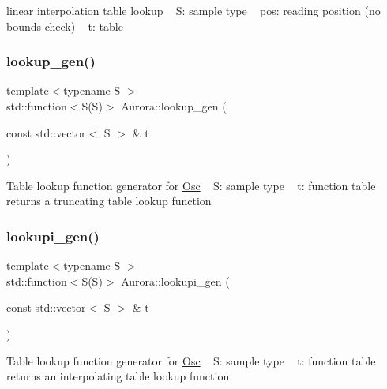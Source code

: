linear interpolation table lookup ~\newline
S\+: sample type ~\newline
pos\+: reading position (no bounds check) ~\newline
t\+: table \mbox{\label{namespace_aurora_ade912bee8dbe0351b2193809ce592d8b}} 
\subsubsection{\texorpdfstring{lookup\+\_\+gen()}{lookup\_gen()}}
{\footnotesize\ttfamily template$<$typename S $>$ \\
std\+::function$<$S(S)$>$ Aurora\+::lookup\+\_\+gen (\begin{DoxyParamCaption}\item[{const std\+::vector$<$ S $>$ \&}]{t }\end{DoxyParamCaption})}

Table lookup function generator for \hyperlink{class_aurora_1_1_osc}{Osc} ~\newline
S\+: sample type ~\newline
t\+: function table ~\newline
returns a truncating table lookup function \mbox{\label{namespace_aurora_a043c55515e053a8d6f31ed7077a1bea6}} 
\subsubsection{\texorpdfstring{lookupi\+\_\+gen()}{lookupi\_gen()}}
{\footnotesize\ttfamily template$<$typename S $>$ \\
std\+::function$<$S(S)$>$ Aurora\+::lookupi\+\_\+gen (\begin{DoxyParamCaption}\item[{const std\+::vector$<$ S $>$ \&}]{t }\end{DoxyParamCaption})}

Table lookup function generator for \hyperlink{class_aurora_1_1_osc}{Osc} ~\newline
S\+: sample type ~\newline
t\+: function table ~\newline
returns an interpolating table lookup function \mbox{\label{namespace_aurora_a8a142312f627aaa19ba0e8a87f33d00b}} 
